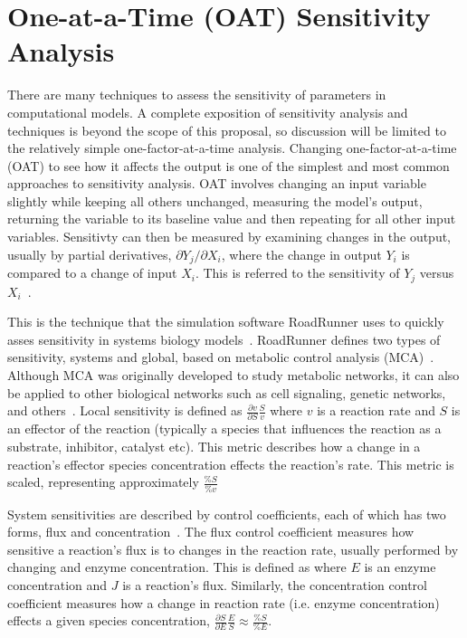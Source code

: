 \documentclass[12pt]{report}
\begin{document}
\section{One-at-a-Time (OAT) Sensitivity Analysis}

There are many techniques to assess the sensitivity of parameters in computational models. A complete exposition of sensitivity analysis and techniques is beyond the scope of this proposal, so discussion will be limited to the relatively simple one-factor-at-a-time analysis. Changing one-factor-at-a-time (OAT) to see how it affects the output is one of the simplest and most common approaches to sensitivity analysis. OAT involves changing an input variable slightly while keeping all others unchanged, measuring the model's output, returning the variable to its baseline value and then repeating for all other input variables. Sensitivty can then be measured by examining changes in the output, usually by partial derivatives, $\partial Y_j/ \partial X_i$, where the change in output $Y_i$ is compared to a change of input $X_i$. This is referred to the sensitivity of $Y_j$ versus $X_i$~\cite{Saltelli}. 

This is the technique that the simulation software RoadRunner uses to quickly asses sensitivity in systems biology models~\cite{Somogyi2015}. RoadRunner defines two types of sensitivity, systems and global, based on metabolic control analysis (MCA)~\cite{RoadRunnerdocs}. Although MCA was originally developed to study metabolic networks, it can also be applied to other biological networks such as cell signaling, genetic networks, and others~\cite{Zi2011}.  Local sensitivity is defined as $\frac{\partial v}{\partial S}\frac{S}{v}$ where $v$ is a reaction rate and $S$ is an effector of the reaction (typically a species that influences the reaction as a substrate, inhibitor, catalyst etc). This metric describes how a change in a reaction's effector species concentration effects the reaction's rate. This metric is scaled, representing approximately $\frac{\%S}{\%v}$

System sensitivities are described by control coefficients, each of which has two forms, flux and concentration~\cite{RoadRunnerdocs}. The flux control coefficient measures how sensitive a reaction's flux is to changes in the reaction rate, usually performed by changing and enzyme concentration. This is defined as   where $E$ is an enzyme concentration and $J$ is a reaction's flux. Similarly, the concentration control coefficient measures how a change in reaction rate (i.e. enzyme concentration) effects a given species concentration, $\frac{\partial S}{\partial E}\frac{E}{S} \approx \frac{\%S}{\%E}$.
\end{document}
